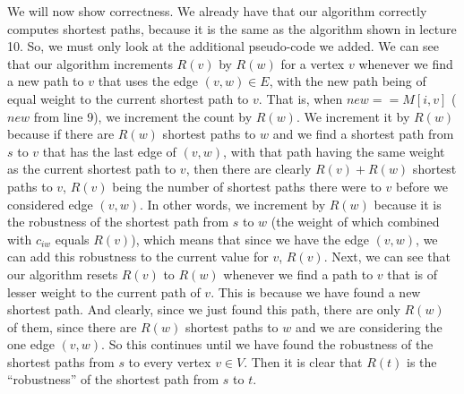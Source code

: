 \documentclass{article}
\begin{document}
    We will now show correctness. We already have that our algorithm correctly
    computes shortest paths, because it is the same as the algorithm shown in
    lecture 10. So, we must only look at the additional pseudo-code
    we added. We can see that our algorithm increments
    $R(v)$ by $R(w)$ for a vertex $v$ whenever we find a new path to $v$ that uses
    the edge $(v,w) \in E$, with the new path being of equal weight to the current
    shortest path to $v$.
    That is, when $new == M[i,v]$ ($new$ from line 9), we increment the count by $R(w)$. We
    increment it by $R(w)$ because if there are $R(w)$ shortest paths to $w$ and
    we find a shortest path from $s$ to $v$ that has the last edge of $(v,w)$,
    with that path having the same weight as the current shortest path to $v$,
    then there are clearly $R(v) + R(w)$ shortest paths to $v$, $R(v)$ being the
    number of shortest paths there were to $v$ before we considered edge
    $(v,w)$. In other words, we increment by $R(w)$ because it is the
    robustness of the shortest path from $s$ to $w$ (the weight of which
    combined with $c_{iw}$ equals $R(v)$), which means that since we
    have the edge $(v,w)$, we can add this robustness to the current value for
    $v$, $R(v)$.
    Next, we can
    see that our algorithm resets $R(v)$ to $R(w)$ whenever we find a path to $v$
    that is of lesser weight to the current path of $v$. This is because we have
    found a new shortest path. And clearly, since we just found this path,
    there are only $R(w)$ of them, since there are $R(w)$ shortest paths to $w$
    and we are considering the one edge $(v,w)$. So this continues until we have
    found the robustness of the shortest paths from $s$ to every vertex $v \in
    V$. Then it is clear that $R(t)$ is the ``robustness'' of the shortest path
    from $s$ to $t$.
    \newpage

\end{document}
